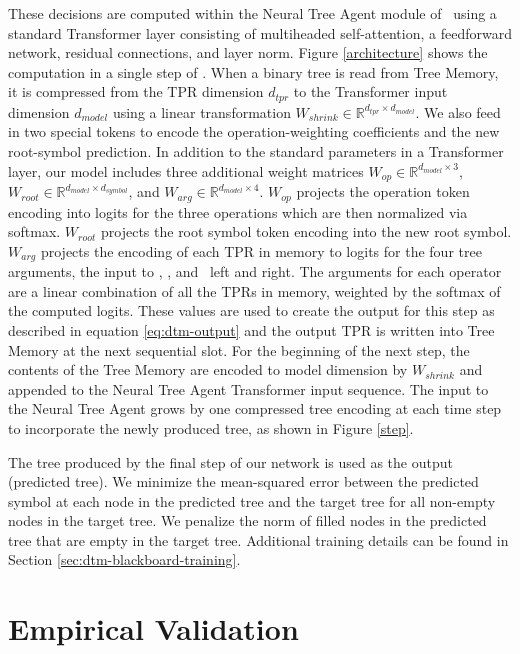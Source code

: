 These decisions are computed within the Neural Tree Agent module of \blackboard\ using a standard Transformer layer \citep{vaswani2017attention} consisting of multiheaded self-attention, a feedforward network, residual connections, and layer norm. Figure \ref{architecture} shows the computation in a single step of \blackboard. When a binary tree is read from Tree Memory, it is compressed from the TPR dimension $d_{tpr}$ to the Transformer input dimension $d_{model}$ using a linear transformation $W_{shrink} \in \mathbb{R}^{d_{tpr} \times d_{model}}$. We also feed in two special tokens to encode the operation-weighting coefficients and the new root-symbol prediction. In addition to the standard parameters in a Transformer layer, our model includes three additional weight matrices $W_{op} \in \mathbb{R}^{d_{model} \times 3}$, $W_{root} \in \mathbb{R}^{d_{model} \times d_{symbol}}$, and $W_{arg} \in \mathbb{R}^{d_{model} \times 4}$. $W_{op}$ projects the operation token encoding into logits for the three operations which are then normalized via softmax. $W_{root}$ projects the root symbol token encoding into the new root symbol. $W_{arg}$ projects the encoding of each TPR in memory to logits for the four tree arguments, the input to \car, \cdr, and \cons\ left and right. The arguments for each operator are a linear combination of all the TPRs in memory, weighted by the softmax of the computed logits. These values are used to create the output for this step as described in equation \ref{eq:dtm-output} and the output TPR is written into Tree Memory at the next sequential slot. For the beginning of the next step, the contents of the Tree Memory are encoded to model dimension by $W_{shrink}$ and appended to the Neural Tree Agent Transformer input sequence. The input to the Neural Tree Agent grows by one compressed tree encoding at each time step to incorporate  the newly produced tree, as shown in Figure \ref{step}.

The tree produced by the final step of our network is used as the output (predicted tree). We minimize the mean-squared error between the predicted symbol at each node in the predicted tree and the target tree for all non-empty nodes in the target tree. We penalize the norm of filled nodes in the predicted tree that are empty in the target tree. Additional training details can be found in Section \ref{sec:dtm-blackboard-training}.

\section{Empirical Validation} \label{sec:dtm-empirical}

